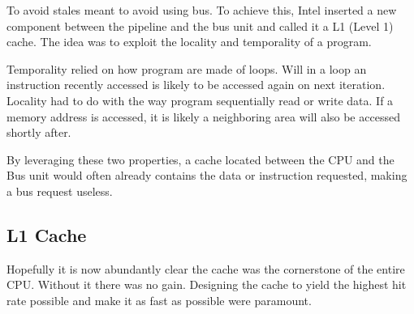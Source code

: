 To avoid stales meant to avoid using bus. To achieve this, Intel inserted a new component between the pipeline and the bus unit and called it a L1 (Level 1) cache. The idea was to exploit the locality and temporality of a program.\\
\par
Temporality relied on how program are made of loops. Will in a loop an instruction recently accessed is likely to be accessed again on next iteration. Locality had to do with the way program sequentially read or write data. If a memory address is accessed, it is likely a neighboring area will also be accessed shortly after.\\
\par
By leveraging these two properties, a cache located between the CPU and the Bus unit would often already contains the data or instruction requested, making a bus request useless.\\
\par
{}




\subsection{L1 Cache}
Hopefully it is now abundantly clear the cache was the cornerstone of the entire CPU. Without it there was no gain. Designing the cache to yield the highest hit rate possible and make it as fast as possible were paramount. 


